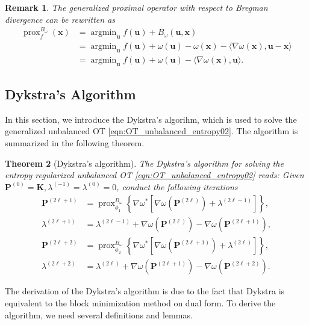 \documentclass[11pt]{book}
\newtheorem{theorem}{Theorem}[section]
\newtheorem{remark}[theorem]{Remark}
\begin{document}
\begin{remark}
    The generalized proximal operator with respect to Bregman divergence can be rewritten as
    \begin{align*}
        \operatorname{prox}^{B_{\omega}}_f(\mathbf{x})& = \operatorname{argmin}_\mathbf{u} f(\mathbf{u}) + B_{\omega}(\mathbf{u},\mathbf{x}) \\
        & = \operatorname{argmin}_\mathbf{u} f(\mathbf{u}) + \omega(\mathbf{u}) - \omega(\mathbf{x}) -  \langle \nabla \omega (\mathbf{x}), \mathbf{u} - \mathbf{x} \rangle\\
        & = \operatorname{argmin}_\mathbf{u} f(\mathbf{u}) + \omega(\mathbf{u}) -  \langle \nabla \omega (\mathbf{x}), \mathbf{u} \rangle.
    \end{align*}
\end{remark}



\subsection{Dykstra's Algorithm}

In this section, we introduce the Dykstra's algorihm, which is used to solve the generalized unbalanced OT \eqref{eqn:OT_unbalanced_entropy02}. The algorithm is summarized in the following theorem.
\begin{theorem}[Dykstra's algorithm]\label{theorem:Dykstra}
    The Dykstra's algorithm for solving the entropy regularized unbalanced OT \eqref{eqn:OT_unbalanced_entropy02} reads: Given $\mathbf{P}^{(0)} = \mathbf{K}, \lambda^{(-1)} = \lambda^{(0)} = 0$, conduct the following iterations
    \begin{align}
        \mathbf{P}^{(2\ell+1)} &= \operatorname{prox}^{B_{\omega}}_{\phi_1} \left\{ \nabla \omega^* \left[ \nabla \omega(\mathbf{P}^{(2\ell)}) + \lambda^{(2\ell-1)} \right] \right\},\\
        \lambda^{(2\ell+1)} &= \lambda^{(2\ell-1)} + \nabla \omega(\mathbf{P}^{(2\ell)}) - \nabla \omega(\mathbf{P}^{(2\ell+1)}),\\
        \mathbf{P}^{(2\ell+2)} &= \operatorname{prox}^{B_{\omega}}_{\phi_2} \left\{ \nabla \omega^* \left[ \nabla \omega(\mathbf{P}^{(2\ell+1)}) + \lambda^{(2\ell)} \right] \right\},\\
        \lambda^{(2\ell+2)} &= \lambda^{(2\ell)} + \nabla \omega(\mathbf{P}^{(2\ell+1)}) - \nabla \omega(\mathbf{P}^{(2\ell+2)}).
    \end{align}
\end{theorem}
The derivation of the Dykstra's algorithm is due to the fact that Dykstra is equivalent to the block minimization method on dual form. To derive the algorithm, we need several definitions and lemmas.
\end{document}
